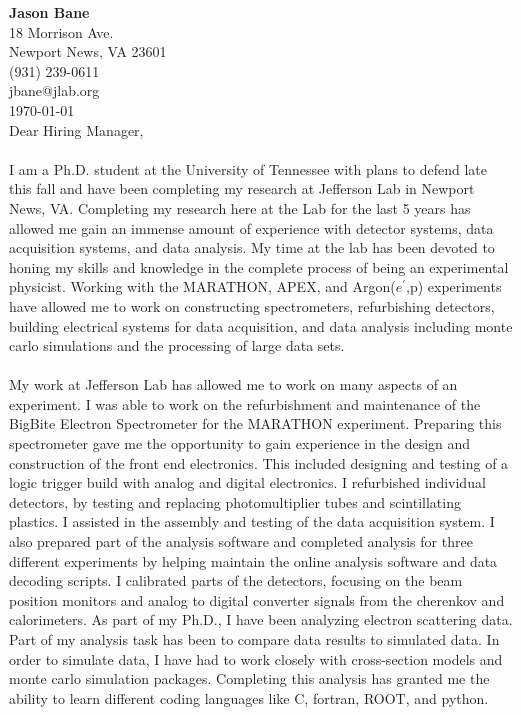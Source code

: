 \documentclass[12pt,letterpaper]{article}
\newcommand{\CPP}
{C\nolinebreak[4]\hspace{-.05em}\raisebox{.22ex}{\footnotesize\bf ++}}
\begin{document}
\vspace*{-1.2cm}
{\textbf{Jason Bane}}\\
18 Morrison Ave. \\
Newport News, VA 23601 \\
(931) 239-0611 \\
jbane@jlab.org \\
\today\\

Dear Hiring Manager, 

\paragraph{}I am a Ph.D. student at the University of Tennessee with plans to defend late this fall and have been completing my research at Jefferson Lab in Newport News, VA. Completing my research here at the Lab for the last 5 years has allowed me gain an immense amount of experience with detector systems, data acquisition systems, and data analysis. My time at the lab has been devoted to honing my skills and knowledge in the complete process of being an experimental physicist. Working with the MARATHON, APEX, and Argon($e^\prime$,p) experiments have allowed me to work on constructing spectrometers, refurbishing detectors, building electrical systems for data acquisition, and data analysis including monte carlo simulations and the processing of large data sets.  
\paragraph{}My work at Jefferson Lab has allowed me to work on many aspects of an experiment. I was able to work on the refurbishment and maintenance of the BigBite Electron Spectrometer for the MARATHON experiment. Preparing this spectrometer gave me the opportunity to gain experience in the design and construction of the front end electronics. This included designing and testing of a logic trigger build with analog and digital electronics. I refurbished individual detectors, by testing and replacing photomultiplier tubes and scintillating plastics.  I assisted in the assembly and testing of the data acquisition system.
I also prepared part of the analysis software and completed analysis for three different experiments by helping maintain the online analysis software and data decoding scripts. I calibrated parts of the detectors, focusing on the beam position monitors and analog to digital converter signals from the cherenkov and calorimeters. As part of my Ph.D., I have been analyzing electron scattering data. Part of my analysis task has been to compare data results to simulated data. In order to simulate data, I have had to work closely with cross-section models and monte carlo simulation packages. Completing this analysis has granted me the ability to learn different coding languages like \CPP, fortran, ROOT, and python.
\end{document}
